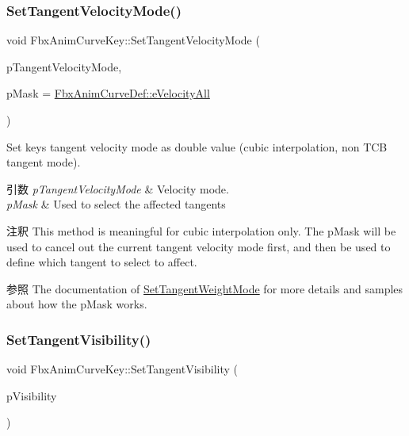 \subsubsection{\texorpdfstring{Set\+Tangent\+Velocity\+Mode()}{SetTangentVelocityMode()}}
{\footnotesize\ttfamily void Fbx\+Anim\+Curve\+Key\+::\+Set\+Tangent\+Velocity\+Mode (\begin{DoxyParamCaption}\item[{\hyperlink{class_fbx_anim_curve_def_a747576beffa78ab236d2e140da395fff}{Fbx\+Anim\+Curve\+Def\+::\+E\+Velocity\+Mode}}]{p\+Tangent\+Velocity\+Mode,  }\item[{\hyperlink{class_fbx_anim_curve_def_a747576beffa78ab236d2e140da395fff}{Fbx\+Anim\+Curve\+Def\+::\+E\+Velocity\+Mode}}]{p\+Mask = {\ttfamily \hyperlink{class_fbx_anim_curve_def_a747576beffa78ab236d2e140da395fffab8603ba4ecc238f5dee7489b6a0123ee}{Fbx\+Anim\+Curve\+Def\+::e\+Velocity\+All}} }\end{DoxyParamCaption})}

Set key\textquotesingle{}s tangent velocity mode as double value (cubic interpolation, non T\+CB tangent mode). 
\begin{DoxyParams}{引数}
{\em p\+Tangent\+Velocity\+Mode} & Velocity mode. \\
\hline
{\em p\+Mask} & Used to select the affected tangents \\
\hline
\end{DoxyParams}
\begin{DoxyRemark}{注釈}
This method is meaningful for cubic interpolation only. The p\+Mask will be used to cancel out the current tangent velocity mode first, and then be used to define which tangent to select to affect.
\end{DoxyRemark}
\begin{DoxySeeAlso}{参照}
The documentation of \hyperlink{class_fbx_anim_curve_key_a418159da0643ccdbeb5aa59b69b821e0}{Set\+Tangent\+Weight\+Mode} for more details and samples about how the p\+Mask works. 
\end{DoxySeeAlso}
\mbox{\label{class_fbx_anim_curve_key_af38b131031d26da6038b89c17498f05f}} 
\subsubsection{\texorpdfstring{Set\+Tangent\+Visibility()}{SetTangentVisibility()}}
{\footnotesize\ttfamily void Fbx\+Anim\+Curve\+Key\+::\+Set\+Tangent\+Visibility (\begin{DoxyParamCaption}\item[{\hyperlink{class_fbx_anim_curve_def_a70c49072776ac6b3426c57dd80e16e3b}{Fbx\+Anim\+Curve\+Def\+::\+E\+Tangent\+Visibility}}]{p\+Visibility }\end{DoxyParamCaption})}

